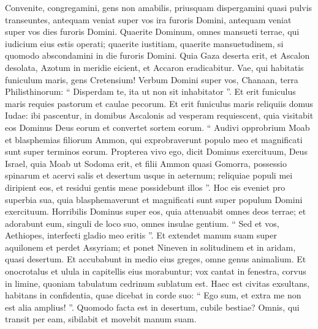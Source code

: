 \begin{biblechapter}
\begin{biblechapter}
 \verse Convenite, congregamini,
 gens non amabilis,
 \verse priusquam dispergamini
 quasi pulvis transeuntes,
 antequam veniat super vos
 ira furoris Domini,
 antequam veniat super vos
 dies furoris Domini.
 \verse Quaerite Dominum,
 omnes mansueti terrae,
 qui iudicium eius estis operati;
 quaerite iustitiam, quaerite mansuetudinem,
 si quomodo abscondamini
 in die furoris Domini.
 \verse Quia Gaza deserta erit,
 et Ascalon desolata,
 Azotum in meridie eicient,
 et Accaron eradicabitur.
 \verse Vae, qui habitatis funiculum maris, gens Cretensium!
 Verbum Domini super vos,
 Chanaan, terra Philisthinorum:
 “ Disperdam te,
 ita ut non sit inhabitator ”.
 \verse Et erit funiculus maris
 requies pastorum et caulae pecorum.
 \verse Et erit funiculus maris
 reliquiis domus Iudae:
 ibi pascentur,
 in domibus Ascalonis ad vesperam requiescent,
 quia visitabit eos Dominus Deus eorum
 et convertet sortem eorum.
 \verse “ Audivi opprobrium Moab
 et blasphemias filiorum Ammon, qui exprobraverunt populo meo
 et magnificati sunt super terminos eorum.
 \verse Propterea vivo ego,
 dicit Dominus exercituum, Deus Israel,
 quia Moab ut Sodoma erit,
 et filii Ammon quasi Gomorra,
 possessio spinarum et acervi salis
 et desertum usque in aeternum;
 reliquiae populi mei diripient eos,
 et residui gentis meae possidebunt illos ”.
 \verse Hoc eis eveniet pro superbia sua, quia blasphemaverunt et magnificati sunt
 super populum Domini exercituum.
 \verse Horribilis Dominus super eos,
 quia attenuabit omnes deos terrae;
 et adorabunt eum, singuli de loco suo,
 omnes insulae gentium.
 \verse “ Sed et vos, Aethiopes,
 interfecti gladio meo eritis ”.
 \verse Et extendet manum suam super aquilonem
 et perdet Assyriam;
 et ponet Nineven in solitudinem
 et in aridam, quasi desertum.
 \verse Et accubabunt in medio eius greges,
 omne genus animalium.
 Et onocrotalus et ulula
 in capitellis eius morabuntur;
 vox cantat in fenestra,
 corvus in limine,
 quoniam tabulatum cedrinum sublatum est.
 \verse Haec est civitas exsultans,
 habitans in confidentia,
 quae dicebat in corde suo:
 “ Ego sum, et extra me non est alia amplius! ”.
 Quomodo facta est in desertum,
 cubile bestiae?
 Omnis, qui transit per eam,
 sibilabit et movebit manum suam.
 

\end{biblechapter}
\end{biblechapter}
